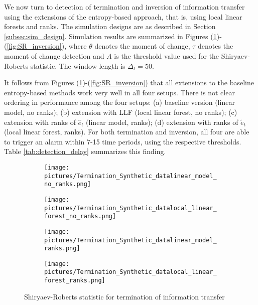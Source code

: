 We now turn to detection of termination and inversion of information transfer using the extensions of the entropy-based approach, that is, using local linear forests and ranks. The simulation designs are as described in Section \ref{subsec:sim_design}. Simulation results are summarized in Figures (\ref{fig:SR_termination})-(\ref{fig:SR_inversion}), where $\theta$ denotes the moment of change, $\tau$ denotes the moment of change detection and $A$ is the threshold value used  for the Shiryaev-Roberts statistic. The window length is $\Delta_t=50$.

It follows from Figures (\ref{fig:SR_termination})-(\ref{fig:SR_inversion}) that all extensions to the baseline entropy-based methods work very well in all four setups. There is not clear ordering in performance among the four setups: (a) baseline version (linear model, no ranks); (b) extension with LLF (local linear forest, no ranks); (c) extension with ranks of $\hat{e}_t$ (linear model, ranks); (d) extension with ranks of $\tilde{e}_t$ (local linear forest, ranks). For both termination and inversion, all four are able to trigger an alarm within 7-15 time periods, using the respective thresholds.  Table \ref{tab:detection_delay} summarizes this finding. 

\begin{figure}[H]
     \begin{subfigure}[b]{0.5\textwidth}
         \centering
         \texttt{[image: pictures/Termination\_Synthetic\_datalinear\_model\_no\_ranks.png]}
     \end{subfigure}
     \hfill
     \begin{subfigure}[b]{0.5\textwidth}
         \centering
         \texttt{[image: pictures/Termination\_Synthetic\_datalocal\_linear\_forest\_no\_ranks.png]}
     \end{subfigure}
     \vfill
     \begin{subfigure}[b]{0.5\textwidth}
         \centering
         \texttt{[image: pictures/Termination\_Synthetic\_datalinear\_model\_ranks.png]}
     \end{subfigure}
    \hfill
     \begin{subfigure}[b]{0.5\textwidth}
         \centering
         \texttt{[image: pictures/Termination\_Synthetic\_datalocal\_linear\_forest\_ranks.png]}     \end{subfigure}
        \caption{Shiryaev-Roberts statistic for termination of information transfer}
        \label{fig:SR_termination}
\end{figure}


